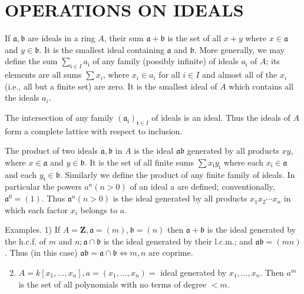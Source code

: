 \documentclass{standalone}
\theoremstyle{definition}
\theoremstyle{remark}
\begin{document}
\section{OPERATIONS ON IDEALS}
If $\mathfrak{a}, \mathfrak{b}$ are ideals in a ring $A$, their sum $\mathfrak{a}+\mathfrak{b}$ is the set of all $x+y$ where $x \in \mathfrak{a}$ and $y \in \mathfrak{b}$. It is the smallest ideal containing $\mathfrak{a}$ and $\mathfrak{b}$. More generally, we may define the sum $\sum_{\mathfrak{i} \in I} a_{\mathfrak{i}}$ of any family (possibly infinite) of ideals $a_{\mathfrak{i}}$ of $A$; its elements are all sums $\sum x_{i}$, where $x_{i} \in a_{i}$ for all $i \in I$ and almost all of the $x_{i}$ (i.e., all but a finite set) are zero. It is the smallest ideal of $A$ which contains all the ideals $a_{i}$.

The intersection of any family $\left(\mathfrak{a}_{\mathfrak{i}}\right)_{\mathfrak{t} \in I}$ of ideals is an ideal. Thus the ideals of $A$ form a complete lattice with respect to inclusion.

The product of two ideals $\mathfrak{a}, \mathfrak{b}$ in $A$ is the ideal $\mathfrak{a} \mathfrak{b}$ generated by all products $x y$, where $x \in \mathfrak{a}$ and $y \in \mathfrak{b}$. It is the set of all finite sums $\sum x_{\mathfrak{i}} y_{\mathfrak{i}}$ where each $x_{\mathfrak{i}} \in \mathfrak{a}$ and each $y_{\mathfrak{t}} \in \mathfrak{b}$. Similarly we define the product of any finite family of ideals. In particular the powers $a^{n}(n>0)$ of an ideal a are defined; conventionally, $\mathfrak{a}^{0}=(1)$. Thus $\mathfrak{a}^{n}(n>0)$ is the ideal generated by all products $x_{1} x_{2} \cdots x_{n}$ in which each factor $x_{i}$ belongs to $a$.

Examples. 1) If $A=\mathbf{Z}, \mathfrak{a}=(m), \mathfrak{b}=(n)$ then $\mathfrak{a}+\mathfrak{b}$ is the ideal generated by the h.c.f. of $m$ and $n ; \mathfrak{a} \cap \mathfrak{b}$ is the ideal generated by their l.c.m.; and $\mathfrak{a} \mathfrak{b}=(m n)$. Thus (in this case) $\mathfrak{a} \mathfrak{b}=\mathfrak{a} \cap \mathfrak{b} \Leftrightarrow m, n$ are coprime.

\begin{enumerate}
  \setcounter{enumi}{1}
  \item $A=k\left[x_{1}, \ldots, x_{n}\right], a=\left(x_{1}, \ldots, x_{n}\right)=$ ideal generated by $x_{1}, \ldots, x_{n}$. Then $a^{m}$ is the set of all polynomials with no terms of degree $<m$.
\end{enumerate}
\end{document}
